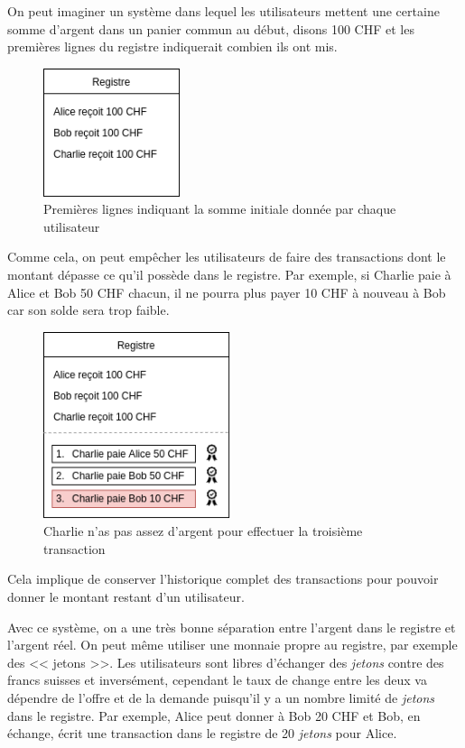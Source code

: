 On peut imaginer un système dans lequel les utilisateurs mettent une certaine somme d'argent dans un panier commun au début, disons 100 CHF et les premières lignes du registre indiquerait combien ils ont mis.

\begin{figure}[H]
  \centering
  \includegraphics[width=4cm]{images/crypto_6.png}
  \caption{Premières lignes indiquant la somme initiale donnée par chaque utilisateur}
\end{figure}

Comme cela, on peut empêcher les utilisateurs de faire des transactions dont le montant dépasse ce qu'il possède dans le registre. Par exemple, si Charlie paie à Alice et Bob 50 CHF chacun, il ne pourra plus payer 10 CHF à nouveau à Bob car son solde sera trop faible.

\begin{figure}[H]
  \centering
  \includegraphics[width=5.5cm]{images/crypto_7.png}
  \caption{Charlie n'as pas assez d'argent pour effectuer la troisième transaction}
\end{figure}

Cela implique de conserver l'historique complet des transactions pour pouvoir donner le montant restant d'un utilisateur.

Avec ce système, on a une très bonne séparation entre l'argent dans le registre et l'argent réel. On peut même utiliser une monnaie propre au registre, par exemple des << jetons >>. Les utilisateurs sont libres d'échanger des \emph{jetons} contre des francs suisses et inversément, cependant le taux de change entre les deux va dépendre de l'offre et de la demande puisqu'il y a un nombre limité de \emph{jetons} dans le registre. Par exemple, Alice peut donner à Bob 20 CHF et Bob, en échange, écrit une transaction dans le registre de 20 \emph{jetons} pour Alice.

